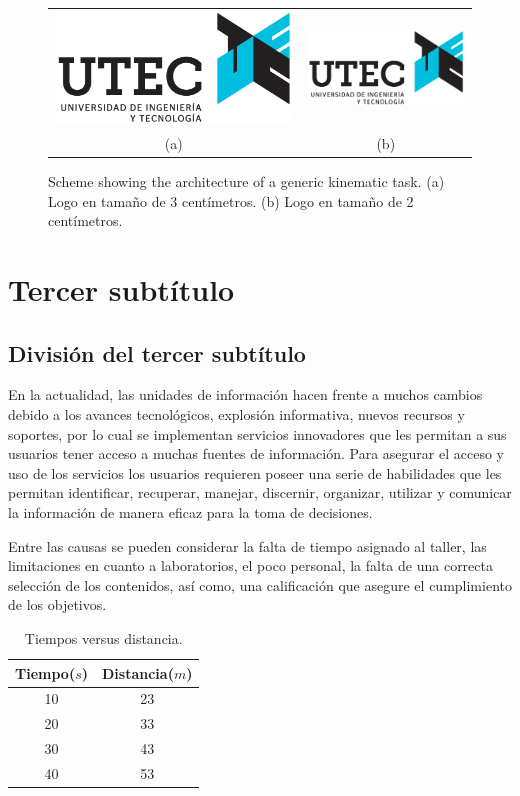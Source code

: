 \begin{figure} 
\begin{center}
\begin{tabular}{cc}
\includegraphics[height=3cm]{images/logo_utec.png} &
\includegraphics[height=2cm]{images/logo_utec.png} \\
(a) & (b)
\end{tabular}
\caption{\label{fig:diagram2}Scheme showing the architecture of a generic kinematic task. (a) Logo en tamaño de 3 centímetros. (b) Logo en tamaño de 2 centímetros.}
\end{center}
\end{figure}


\section{Tercer subtítulo}

\subsection{División del tercer subtítulo}

En la actualidad, las unidades de información hacen frente a muchos cambios
debido a los avances tecnológicos, explosión informativa, nuevos recursos y
soportes, por lo cual se implementan servicios innovadores que les permitan a
sus usuarios tener acceso a muchas fuentes de información. Para asegurar el
acceso y uso de los servicios los usuarios requieren poseer una serie de
habilidades que les permitan identificar, recuperar, manejar, discernir,
organizar, utilizar y comunicar la información de manera eficaz para la toma de
decisiones.

Entre las causas se pueden considerar la falta de tiempo asignado al taller,
las limitaciones en cuanto a laboratorios, el poco personal, la falta de una
correcta selección de los contenidos, así como, una calificación que asegure el
cumplimiento de los objetivos.

\begin{table}[H]
    \centering
    \begin{tabular}{c|c}
        Tiempo($s$) & Distancia($m$) \\
        \hline
        10 & 23 \\
        20 & 33 \\
        30 & 43 \\
        40 & 53 \\
    \end{tabular}
    \caption{Tiempos versus distancia.}
    \label{tab:tiempo_versus_distancia}
\end{table}